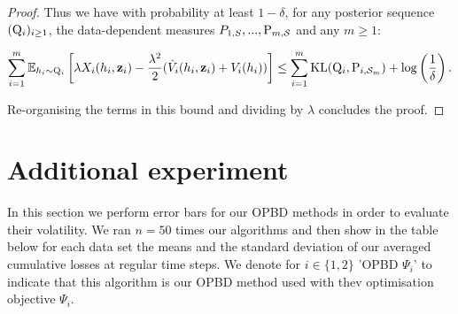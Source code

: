 \begin{proof}
 Thus we have with probability at least $1-\delta$, for any posterior sequence $(\Q_{i})_{i\geq 1}$, the data-dependent measures $P_{1,S},...,\P_{m,\S}$ and any $m\geq 1$:

 \begin{align*}
  \sum_{i=1}^m \mathbb{E}_{h_i\sim \Q_{i}}\left[\lambda X_i(h_i,\z_i)  - \frac{\lambda^2}{2}(\hat{V}_i(h_i,\z_i) + V_i(h_i))\right] \leq \sum_{i=1}^m \operatorname{KL}(\Q_{i},\P_{i,\Sm}) + \log \left( \frac{1}{\delta}  \right).
 \end{align*}

 Re-organising the terms in this bound and dividing by $\lambda$ concludes the proof.

 \end{proof}


\section{Additional experiment}
\label{sec: error_bars}

In this section we perform error bars for our OPBD methods in order to evaluate their volatility.
We ran $n=50$ times our algorithms and then show in the table below for each data set the means and the standard deviation of our averaged cumulative losses at regular time steps. We denote for $i\in\{1,2\}$ 'OPBD $\Psi_i$' to indicate that this algorithm is our OPBD method used with thev optimisation objective $\Psi_i$.


